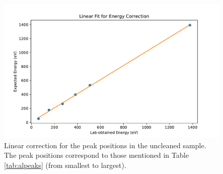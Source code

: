 \documentclass[12pt]{article}
\begin{document}
\begin{figure}[H]
  \includegraphics[scale = 0.7]{linear.pdf}
  \caption{Linear correction for the peak positions in the uncleaned sample. The peak positions correspond to those mentioned in Table \ref{tab:alpeaks} (from smallest to largest).}
  \label{linear}
\end{figure}
%
\printbibliography[heading=bibintoc]{}
\end{document}
